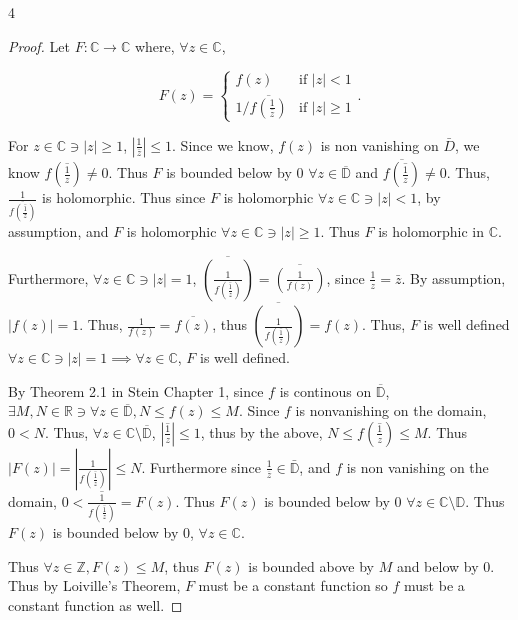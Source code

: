 \documentclass{article}
\newcommand{\C}{\mathbb{C}}
\newcommand{\R}{\mathbb{R}}
\newcommand{\Z}{\mathbb{Z}}
\newcommand{\abs}[1]{\left\lvert #1\right\rvert}
\begin{document}
\bigskip

\begin{PROB}{4}\label{Problem 4.}
    
\end{PROB}
\begin{proof}
    Let $F: \C \to \C$ where, $\forall z \in \C$,  
    
    \begin{equation*}
        F(z) = \begin{cases*}
            f(z) & \text{if $|z| < 1$} \\
            1 / \overline{f(\frac{1}{\bar{z}})} & \text{if $|z| \geq 1$}
        \end{cases*}.
    \end{equation*} 

    For $z \in \C \ni |z| \geq 1$, $\abs{\frac{1}{\bar{z}}} \leq 1$. Since we know, $f(z)$ is non vanishing on $\bar{D}$, we know $f(\overline{\frac{1}{z}}) \neq 0$. Thus $F$ is bounded below by 0 $\forall z \in \overline{\mathbb{D}}$ and $\overline{f(\overline{\frac{1}{z}})} \neq 0$. Thus, $\frac{1}{\overline{f(\overline{\frac{1}{z}})}}$ is holomorphic. Thus since $F$ is holomorphic $\forall z \in \C \ni |z|< 1$, by assumption, and $F$ is holomorphic $\forall z \in \C \ni |z| \geq 1$. Thus $F$ is holomorphic in $\C$.
    
    Furthermore, $\forall z \in \C \ni |z| = 1$, $\overline{(\frac{1}{f(\overline{\frac{1}{z}})})} = \overline{\left(\frac{1}{f(z)}\right)}$, since $\frac{1}{z} = \bar{z}$. By assumption, $|f(z)| =1 $. Thus, $\frac{1}{f(z)} = \overline{f(z)}$, thus $\overline{(\frac{1}{f(\overline{\frac{1}{z}})})} = f(z)$. Thus, $F$ is well defined $\forall z \in \C \ni |z| = 1 \implies \forall z \in \C$, $F$ is well defined.  
    
    By Theorem 2.1 in Stein Chapter 1, since $f$ is continous on $\overline{\mathbb{D}}$, $\exists M, N \in \R \ni \forall z \in \overline{\mathbb{D}}, N \leq f(z) \leq M$. Since $f$ is nonvanishing on the domain, $0 < N$. Thus, $\forall z \in \C \setminus \overline{\mathbb{D}}$, $\abs{\overline{\frac{1}{z}}} \leq 1$, thus by the above, $N \leq f(\overline{\frac{1}{z}}) \leq M$. Thus $\abs{F(z)} = \abs{\frac{1}{f(\overline{\frac{1}{z}})}} \leq N$. Furthermore since $\frac{1}{\overline{z}} \in \bar{\mathbb{D}}$, and $f$ is non vanishing on the domain, $0 < \overline{\frac{1}{f(\overline{\frac{1}{z}})}} = F(z)$. Thus $F(z)$ is bounded below by 0 $\forall z \in \C \setminus \mathbb{D}$. Thus $F(z)$ is bounded below by 0, $\forall z \in \C$.         
    
    Thus $\forall z \in \Z, F(z) \leq M$, thus $F(z)$ is bounded above by $M$ and below by 0. Thus by Loiville's Theorem, $F$ must be a constant function so $f$ must be a constant function as well.            
\end{proof}
\end{document}
